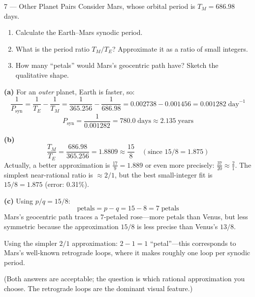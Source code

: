 \documentclass[11pt,letterpaper]{article}
\begin{document}
\vspace{0.5cm}

\begin{problem}{7 — Other Planet Pairs}
Consider Mars, whose orbital period is $T_M = 686.98$ days.
\begin{enumerate}[label=(\alph*)]
  \item Calculate the Earth–Mars synodic period.
  \item What is the period ratio $T_M / T_E$? Approximate it as
    a ratio of small integers.
  \item How many ``petals'' would Mars's geocentric path have?
    Sketch the qualitative shape.
\end{enumerate}
\end{problem}

\begin{solution}
\textbf{(a)} For an \textit{outer} planet, Earth is faster, so:
\[
  \frac{1}{P_\text{syn}} = \frac{1}{T_E} - \frac{1}{T_M}
  = \frac{1}{365.256} - \frac{1}{686.98}
  = 0.002738 - 0.001456 = 0.001282\;\text{day}^{-1}
\]
\[
  P_\text{syn} = \frac{1}{0.001282} = \boxed{780.0\;\text{days}
  \approx 2.135\;\text{years}}
\]

\textbf{(b)}
\[
  \frac{T_M}{T_E} = \frac{686.98}{365.256} = 1.8809 \approx
  \boxed{\frac{15}{8}} \quad (\text{since } 15/8 = 1.875)
\]
Actually, a better approximation is $\frac{17}{9} = 1.889$ or
even more precisely: $\frac{37}{20} \approx \frac{2}{1}$. The
simplest near-rational ratio is $\approx 2/1$, but the best
small-integer fit is $15/8 = 1.875$ (error: 0.31\%).

\textbf{(c)} Using $p/q = 15/8$:
\[
  \text{petals} = p - q = 15 - 8 = \boxed{7\;\text{petals}}
\]
Mars's geocentric path traces a 7-petaled rose—more petals than
Venus, but less symmetric because the approximation $15/8$ is
less precise than Venus's $13/8$.

Using the simpler $2/1$ approximation: $2 - 1 = 1$ ``petal''—this
corresponds to Mars's well-known retrograde loops, where it makes
roughly one loop per synodic period.

(Both answers are acceptable; the question is which rational
approximation you choose. The retrograde loops are the dominant
visual feature.)
\end{solution}

\newpage
\end{document}
